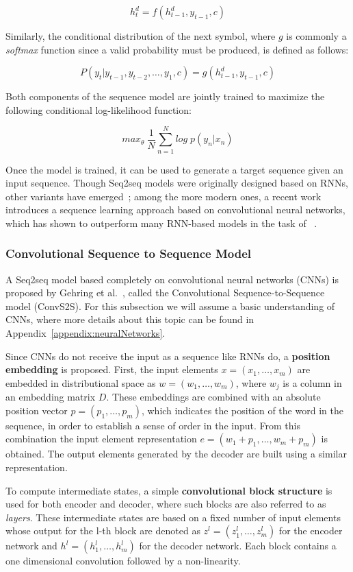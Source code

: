 \[
    h_{t}^d= f(h_{t-1}^d,y_{t-1},c)
\]

Similarly, the conditional distribution of the next symbol, where $g$ is commonly a 
\textit{softmax} function since a valid probability must be produced, is defined as follows:

\[
    P(y_t|y_{t-1},y_{t-2},\ldots,y_1,c) = g(h_{t-1}^d,y_{t-1},c)
\]

Both components of the sequence model are jointly trained to maximize the following 
conditional log-likelihood function:

\[
    max_{\theta} \: \frac{1}{N} \sum_{n=1}^N log \; p(y_n|x_n)
\]

Once the model is trained, it can be used to generate a target sequence given an input 
sequence. Though Seq2seq models were originally designed based on RNNs, other variants have 
emerged~\cite{semPar:SutskeverVL14,nmt:DongL16}; among the more modern ones, a recent work 
introduces a sequence learning approach based on convolutional neural networks, which has 
shown to outperform many RNN-based models in the task of \NLtoSPARQL~\cite{nmt:nl-to-sparql-Yin19}.

\subsubsection{Convolutional Sequence to Sequence Model}
\label{cap2:theoFrame/semPar/seq2seq/convS2S}
A Seq2seq model based completely on convolutional neural networks (CNNs) is 
proposed by Gehring et al.~\cite{nmt:convS2S-GehringAGYD17}, called the Convolutional 
Sequence-to-Sequence model (ConvS2S). For this subsection we will assume a basic 
understanding of CNNs, where more details about this topic can be found in 
Appendix~\ref{appendix:neuralNetworks}.

Since CNNs do not receive the input as a sequence like RNNs do, a \textbf{position embedding} 
is proposed. First, the input elements $x=(x_1,\ldots,x_m)$ are embedded in distributional 
space as $w=(w_1,\ldots,w_m)$, where $w_j$ is a column in an embedding matrix $D$. These 
embeddings are combined with an absolute position vector $p=(p_1,\ldots, p_m)$, which 
indicates the position of the word in the sequence, in order to establish a sense of order in 
the input. From this combination the input element representation $e=(w_1+p_1,\ldots, w_m+p_m)$ 
is obtained. The output elements generated by the decoder are built using a similar 
representation.

To compute intermediate states, a simple \textbf{convolutional block structure} is used for both 
encoder and decoder, where such blocks are also referred to as \textit{layers}. These intermediate 
states are based on a fixed number of input elements whose output for the l-th block are 
denoted as $z^l=(z_1^l,\ldots,z_m^l)$ for the encoder network and $h^l=(h_1^l,\ldots,h_m^l)$ 
for the decoder network. Each block contains a one dimensional convolution followed by a 
non-linearity.

